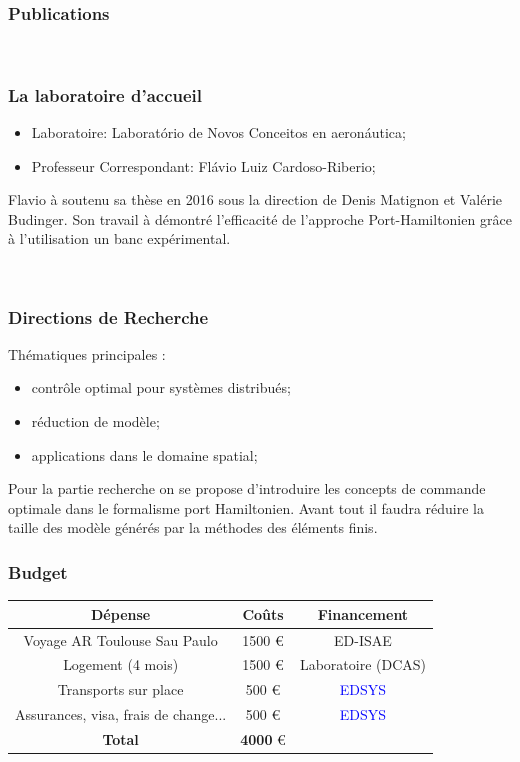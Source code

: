 \documentclass{beamer}
\begin{document}
\begin{frame}

\frametitle{Publications}
\nobibliography*
{} \\
\vspace{3mm}
\end{frame}



\begin{frame}
\frametitle{La laboratoire d'accueil}
\begin{itemize}
\item Laboratoire: Laborat\'orio de Novos Conceitos en aeron\'autica;
\item Professeur Correspondant: Fl\'avio Luiz Cardoso-Riberio;
\end{itemize}
Flavio à soutenu sa thèse en 2016 sous la direction de Denis Matignon et Valérie Budinger. Son travail à démontré l'efficacité de l'approche Port-Hamiltonien grâce à l'utilisation un banc expérimental.  

\footnotesize
{} \\
\vspace{3mm}
\end{frame}

\begin{frame}
\frametitle{Directions de Recherche}
Thématiques principales :
\begin{itemize}
\item contrôle optimal pour systèmes distribués;
\item réduction de modèle;
\item applications dans le domaine spatial;
\end{itemize}
Pour la partie recherche on se propose d'introduire les concepts de commande optimale dans le formalisme port Hamiltonien. Avant tout il faudra réduire la taille des modèle générés par la méthodes des éléments finis.
\end{frame}

\begin{frame}
\frametitle{Budget}

\begin{tabular}{|c|c|c|}
	\hline 
\textbf{Dépense}	& \textbf{Co\^uts} & \textbf{Financement} \\ 
	\hline 
Voyage AR Toulouse Sau Paulo	& 1500 \euro  & ED-ISAE \\ 
	\hline 
 Logement (4 mois)	& 1500 \euro & Laboratoire (DCAS) \\ 
	\hline 
Transports sur place & 500 \euro  & \textcolor{blue}{EDSYS} \\ 
	\hline
Assurances, visa, frais de change... & 500 \euro  & \textcolor{blue}{EDSYS} \\ 
\hline
\textbf{Total}	& \textbf{4000} \euro &  \\ 
	\hline 
\end{tabular} 

\end{frame}
\end{document}
